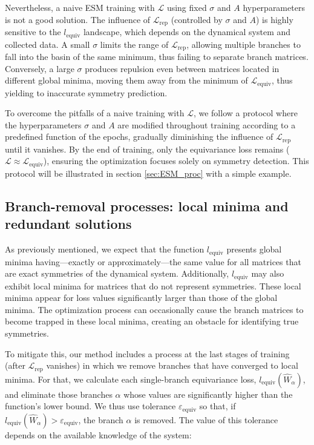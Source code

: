 
Nevertheless, a naive ESM training with $\mathcal{L}$ using fixed $\sigma$ and $A$ hyperparameters is not a good solution. The influence of $\mathcal{L}_{\mathrm{rep}}$ (controlled by $\sigma$ and $A$) is highly sensitive to the $l_{\mathrm{equiv}}$ landscape, which depends on the dynamical system and collected data. A small $\sigma$ limits the range of $\mathcal{L}_{\mathrm{rep}}$, allowing multiple branches to fall into the basin of the same minimum, thus failing to separate branch matrices. Conversely, a large $\sigma$ produces repulsion even between matrices located in different global minima, moving them away from the minimum of $\mathcal{L}_{\mathrm{equiv}}$, thus yielding to inaccurate symmetry prediction.


To overcome the pitfalls of a naive training with $\mathcal{L}$, we follow a protocol where the hyperparameters $\sigma$ and $A$ are modified throughout training according to a predefined function of the epochs, gradually diminishing the influence of $\mathcal{L}_{\mathrm{rep}}$ until it vanishes. By the end of training, only the equivariance loss remains ($\mathcal{L} \approx \mathcal{L}_{\mathrm{equiv}}$), ensuring the optimization focuses solely on symmetry detection. This protocol will be illustrated in section \ref{sec:ESM_proc} with a simple example.




\subsection{Branch-removal processes: local minima and redundant solutions}\label{sec:local_redundant}

As previously mentioned, we expect that the function $l_{\mathrm{equiv}}$ presents global minima having—exactly or approximately—the same value for all matrices that are exact symmetries of the dynamical system. Additionally, $l_{\mathrm{equiv}}$ may also exhibit local minima for matrices that do not represent symmetries. These local minima appear for loss values significantly larger than those of the global minima. The optimization process can occasionally cause the branch matrices to become trapped in these local minima, creating an obstacle for identifying true symmetries.

To mitigate this, our method includes a process at the last stages of training (after $\mathcal{L}_{\mathrm{rep}}$ vanishes) in which we remove branches that have converged to local minima. For that, we calculate each single-branch equivariance loss, $l_{\mathrm{equiv}} (\hat{W}_{\alpha})$, and eliminate those branches $\alpha$ whose values are significantly higher than the function's lower bound. We thus use tolerance $\varepsilon_{\mathrm{equiv}}$ so that, if $l_{\mathrm{equiv}} (\hat{W}_{\alpha}) > \varepsilon_{\mathrm{equiv}}$, the branch $\alpha$ is removed. The value of this tolerance depends on the available knowledge of the system:

